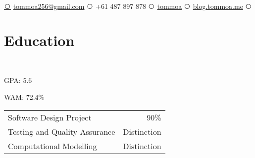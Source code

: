 \documentclass[a4paper]{style}
\def\ci#1{\textcircled{\resizebox{.5em}{!}{#1}}}
\begin{document}
{
\href{mailto:tommoa256@gmail.com}{\ci{\faEnvelope}} {\fontsize{10}{10}\selectfont \href{mailto:tommoa256@gmail.com}{tommoa256@gmail.com}}}
{
\ci{\faPhone}  {\fontsize{10}{10}\selectfont +61 487 897 878} 
}
{
\href{https://github.com/tommoa}{\ci{\faGithub}} {\fontsize{10}{10}\selectfont \href{https://github.com/tommoa}{tommoa}}
}
{
\href{https://blog.tommoa.me/}{\ci{\faFirefox}} {\fontsize{10}{10}\selectfont \href{https://blog.tommoa.me/}{blog.tommoa.me}}
}
{
\href{https://www.linkedin.com/in/tom-almeida-260866165/}{\ci{\faLinkedin}}
}


\begin{minipage}[t]{0.45\textwidth} %


\section{Education} 
 \\
\vspace{\topsep} %
\vspace{1pt}
\begin{tightitemize}
    \item GPA\@: 5.6
    \item WAM\@: 72.4\%
\end{tightitemize}
\begin{tabular}{l|r}
	Software Design Project & 90\% \\
	Testing and Quality Assurance & Distinction \\
	Computational Modelling & Distinction \\
\end{tabular}

\vspace{\topsep}


\end{minipage}
\end{document}

